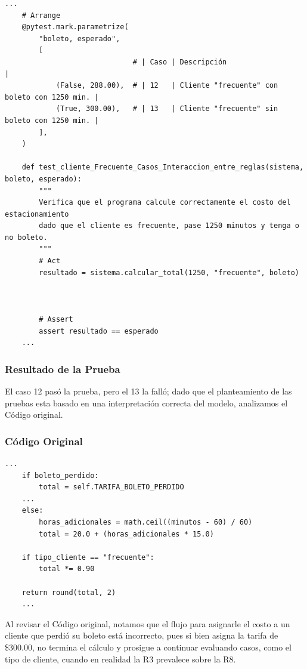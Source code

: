 \documentclass[11pt,letterpaper]{article}
\begin{document}
\begin{lstlisting}[style=practica]
    ...
    # Arrange
    @pytest.mark.parametrize(
        "boleto, esperado",
        [
                              # | Caso | Descripción                                  |
            (False, 288.00),  # | 12   | Cliente "frecuente" con boleto con 1250 min. |
            (True, 300.00),   # | 13   | Cliente "frecuente" sin boleto con 1250 min. |
        ],
    )

    def test_cliente_Frecuente_Casos_Interaccion_entre_reglas(sistema, boleto, esperado):
        """
        Verifica que el programa calcule correctamente el costo del estacionamiento
        dado que el cliente es frecuente, pase 1250 minutos y tenga o no boleto.
        """
        # Act
        resultado = sistema.calcular_total(1250, "frecuente", boleto)


	
        # Assert
        assert resultado == esperado
    ...
\end{lstlisting}
\subsubsection{Resultado de la Prueba}
\label{sec:org8627415}

El caso 12 pasó la prueba, pero el 13 la falló; dado que el planteamiento de las pruebas esta basado en una interpretación correcta del modelo, analizamos el Código original.
\subsubsection{Código Original}
\label{sec:org5f45d3c}


\begin{lstlisting}[style=practica]
    ...
    if boleto_perdido:
        total = self.TARIFA_BOLETO_PERDIDO     
    ...
    else:
        horas_adicionales = math.ceil((minutos - 60) / 60)
        total = 20.0 + (horas_adicionales * 15.0)

    if tipo_cliente == "frecuente":
        total *= 0.90
	
    return round(total, 2)
    ...
\end{lstlisting}

Al revisar el Código original, notamos que el flujo para asignarle el costo a un cliente que perdió su boleto está incorrecto, pues si bien asigna la tarifa de \$300.00, no termina el cálculo y prosigue a continuar evaluando casos, como el tipo de cliente, cuando en realidad la R3 prevalece sobre la R8.
\end{document}
